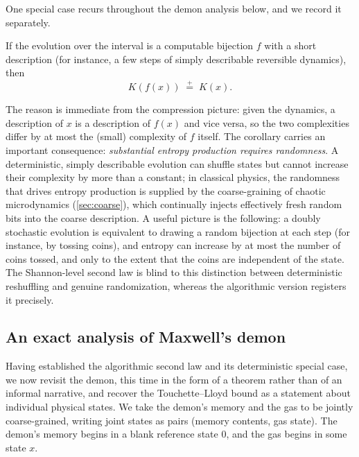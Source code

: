 \documentclass[11pt]{article}
\newcommand{\peq}{\mathrel{\stackrel{+}{=}}}
\begin{document}
One special case recurs throughout the demon analysis below, and we record it separately.

\begin{corollary}
\label{cor:deterministic}
If the evolution over the interval is a computable bijection $f$ with a short description (for instance, a few steps of simply describable reversible dynamics), then
\[
K(f(x)) \;\peq\; K(x).
\]
\end{corollary}

The reason is immediate from the compression picture: given the dynamics, a description of $x$ is a description of $f(x)$ and vice versa, so the two complexities differ by at most the (small) complexity of $f$ itself. The corollary carries an important consequence: \emph{substantial entropy production requires randomness}. A deterministic, simply describable evolution can shuffle states but cannot increase their complexity by more than a constant; in classical physics, the randomness that drives entropy production is supplied by the coarse-graining of chaotic microdynamics (\cref{sec:coarse}), which continually injects effectively fresh random bits into the coarse description. A useful picture is the following: a doubly stochastic evolution is equivalent to drawing a random bijection at each step (for instance, by tossing coins), and entropy can increase by at most the number of coins tossed, and only to the extent that the coins are independent of the state. The Shannon-level second law is blind to this distinction between deterministic reshuffling and genuine randomization, whereas the algorithmic version registers it precisely.

\subsection{An exact analysis of Maxwell's demon}
\label{sec:demon}

Having established the algorithmic second law and its deterministic special case, we now revisit the demon, this time in the form of a theorem rather than of an informal narrative, and recover the Touchette--Lloyd bound as a statement about individual physical states. We take the demon's memory and the gas to be jointly coarse-grained, writing joint states as pairs (memory contents, gas state). The demon's memory begins in a blank reference state $0$, and the gas begins in some state $x$.
\end{document}
